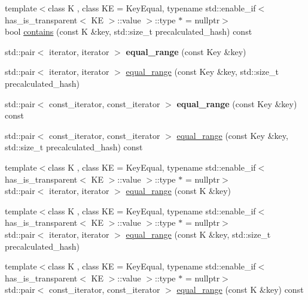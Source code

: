 \begin{DoxyCompactItemize}
\item 
{\footnotesize template$<$class K , class KE  = Key\+Equal, typename std\+::enable\+\_\+if$<$ has\+\_\+is\+\_\+transparent$<$ K\+E $>$\+::value $>$\+::type $\ast$  = nullptr$>$ }\\bool \mbox{\hyperlink{classtsl_1_1robin__set_aef184b7334d440fb7ff915205bfbfb34}{contains}} (const K \&key, std\+::size\+\_\+t precalculated\+\_\+hash) const
\item 
\mbox{\label{classtsl_1_1robin__set_a9ca20230c0c5d01285751024a4b798af}} 
std\+::pair$<$ iterator, iterator $>$ {\bfseries equal\+\_\+range} (const Key \&key)
\item 
std\+::pair$<$ iterator, iterator $>$ \mbox{\hyperlink{classtsl_1_1robin__set_a1c863ebce6a1bc4c2ad69e67f1331661}{equal\+\_\+range}} (const Key \&key, std\+::size\+\_\+t precalculated\+\_\+hash)
\item 
\mbox{\label{classtsl_1_1robin__set_ad3cded602ca0cc632e8df3ca1d84547a}} 
std\+::pair$<$ const\+\_\+iterator, const\+\_\+iterator $>$ {\bfseries equal\+\_\+range} (const Key \&key) const
\item 
std\+::pair$<$ const\+\_\+iterator, const\+\_\+iterator $>$ \mbox{\hyperlink{classtsl_1_1robin__set_a2c006d03e4786428ad08a543cc052170}{equal\+\_\+range}} (const Key \&key, std\+::size\+\_\+t precalculated\+\_\+hash) const
\item 
{\footnotesize template$<$class K , class KE  = Key\+Equal, typename std\+::enable\+\_\+if$<$ has\+\_\+is\+\_\+transparent$<$ K\+E $>$\+::value $>$\+::type $\ast$  = nullptr$>$ }\\std\+::pair$<$ iterator, iterator $>$ \mbox{\hyperlink{classtsl_1_1robin__set_aea679f6fa9dee2077410a462dce63b93}{equal\+\_\+range}} (const K \&key)
\item 
{\footnotesize template$<$class K , class KE  = Key\+Equal, typename std\+::enable\+\_\+if$<$ has\+\_\+is\+\_\+transparent$<$ K\+E $>$\+::value $>$\+::type $\ast$  = nullptr$>$ }\\std\+::pair$<$ iterator, iterator $>$ \mbox{\hyperlink{classtsl_1_1robin__set_aea03fafd11ec0cda987f105f191deaaf}{equal\+\_\+range}} (const K \&key, std\+::size\+\_\+t precalculated\+\_\+hash)
\item 
{\footnotesize template$<$class K , class KE  = Key\+Equal, typename std\+::enable\+\_\+if$<$ has\+\_\+is\+\_\+transparent$<$ K\+E $>$\+::value $>$\+::type $\ast$  = nullptr$>$ }\\std\+::pair$<$ const\+\_\+iterator, const\+\_\+iterator $>$ \mbox{\hyperlink{classtsl_1_1robin__set_ae94df1b2b5d47ac44eecca743871c6c5}{equal\+\_\+range}} (const K \&key) const

\end{DoxyCompactItemize}
